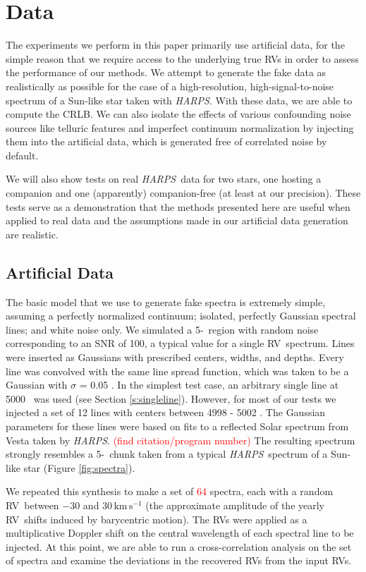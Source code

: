 \documentclass[modern]{aastex62}
\newcommand{\unit}[1]{\mathrm{#1}}
\newcommand{\km}{\unit{km}}
\newcommand{\s}{\unit{s}}
\newcommand{\kms}{\km\,\s^{-1}}
\newcommand{\ang}{\text{\normalfont\AA}}
\newcommand{\todo}[1]{\textcolor{red}{#1}}  %
\newcommand{\acronym}[1]{{\small{#1}}}
\newcommand{\project}[1]{\textsl{#1}}
\newcommand{\HARPS}{\project{\acronym{HARPS}}}
\newcommand{\RV}{\acronym{RV}}
\newcommand{\CRLB}{\acronym{CRLB}}
\begin{document}
\section{Data}
\label{s:data}

The experiments we perform in this paper primarily use artificial data, for the simple reason that we require access to the underlying true RVs in order to assess the performance of our methods. 
We attempt to generate the fake data as realistically as possible for the case of a high-resolution, high-signal-to-noise spectrum of a Sun-like star taken with \HARPS. 
With these data, we are able to compute the \CRLB.  
We can also isolate the effects of various confounding noise sources like telluric features and imperfect continuum normalization by injecting them into the artificial data, which is generated free of correlated noise by default.

We will also show tests on real \HARPS\ data for two stars, one hosting a companion and
one (apparently) companion-free (at least at our precision). 
These tests serve as a demonstration that the methods presented here are useful when applied to real data and the assumptions made in our artificial data generation are realistic.

\subsection{Artificial Data}

The basic model that we use to generate fake spectra is extremely simple, assuming a perfectly normalized continuum; isolated, perfectly Gaussian spectral lines; and white noise only. 
We simulated a 5-\ang\ region with random noise corresponding to an SNR of 100, a typical value for a single \RV\ spectrum. 
Lines were inserted as Gaussians with prescribed centers, widths, and depths. 
Every line was convolved with the same line spread function, which was taken to be a Gaussian with $\sigma$ = 0.05 \ang. 
In the simplest test case, an arbitrary single line at 5000 \ang\ was used (see Section \ref{s:singleline}). 
However, for most of our tests we injected a set of 12 lines with centers between 4998 - 5002 \ang. 
The Gaussian parameters for these lines were based on fits to a reflected Solar spectrum from Vesta taken by \HARPS. \todo{(find citation/program number)} 
The resulting spectrum strongly resembles a 5-\ang\ chunk taken from a typical \HARPS\ spectrum of a Sun-like star (Figure \ref{fig:spectra}).

We repeated this synthesis to make a set of \todo{64} spectra, each with a random \RV\ between $-30$ and $30\,\kms$ (the approximate amplitude of the yearly \RV\ shifts induced by barycentric motion). 
The \RV s were applied as a multiplicative Doppler shift on the central wavelength of each spectral line to be injected. 
At this point, we are able to run a cross-correlation analysis on the set of spectra and examine the deviations in the recovered \RV s from the input \RV s.
\end{document}

